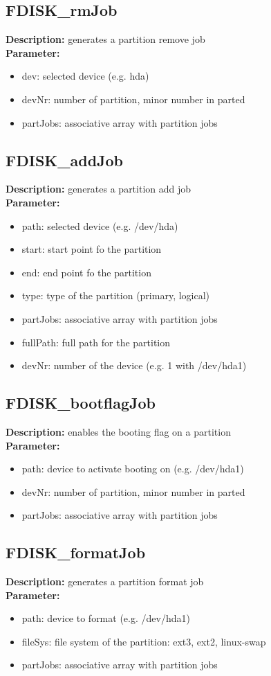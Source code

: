 \subsection{FDISK\_rmJob}
\textbf{Description:} generates a partition remove job\\
\textbf{Parameter:}
\begin{itemize}
\item dev: selected device (e.g. hda)
\item devNr: number of partition, minor number in parted
\item partJobs: associative array with partition jobs
\end{itemize}

\subsection{FDISK\_addJob}
\textbf{Description:} generates a partition add job\\
\textbf{Parameter:}
\begin{itemize}
\item path: selected device (e.g. /dev/hda)
\item start: start point fo the partition
\item end: end point fo the partition
\item type: type of the partition (primary, logical)
\item partJobs: associative array with partition jobs
\item fullPath: full path for the partition
\item devNr: number of the device (e.g. 1 with /dev/hda1)
\end{itemize}

\subsection{FDISK\_bootflagJob}
\textbf{Description:} enables the booting flag on a partition\\
\textbf{Parameter:}
\begin{itemize}
\item path: device to activate booting on (e.g. /dev/hda1)
\item devNr: number of partition, minor number in parted
\item partJobs: associative array with partition jobs
\end{itemize}

\subsection{FDISK\_formatJob}
\textbf{Description:} generates a partition format job\\
\textbf{Parameter:}
\begin{itemize}
\item path: device to format (e.g. /dev/hda1)
\item fileSys: file system of the partition: ext3, ext2, linux-swap
\item partJobs: associative array with partition jobs
\end{itemize}

